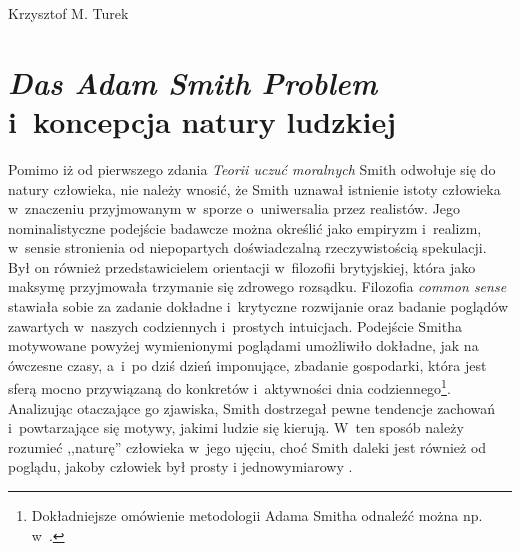 \begin{artplenv}{Krzysztof M. Turek}
\section{\textit{Das Adam Smith Problem} i~koncepcja natury ludzkiej}

Pomimo iż od pierwszego zdania \textit{Teorii uczuć moralnych} Smith
\parencite*[s.~5]{smith_teoria_1989}
odwołuje się do natury
człowieka, nie należy wnosić, że Smith uznawał istnienie istoty człowieka w~znaczeniu
przyjmowanym w~sporze o~uniwersalia przez realistów. Jego nominalistyczne podejście
badawcze można określić jako empiryzm i~realizm, w~sensie
stronienia od niepopartych doświadczalną rzeczywistością spekulacji. Był on również przedstawicielem
orientacji w~filozofii brytyjskiej, która jako maksymę przyjmowała trzymanie się zdrowego rozsądku.
Filozofia \textit{common sense} stawiała sobie za zadanie dokładne i~krytyczne
rozwijanie oraz badanie poglądów zawartych w~naszych
codziennych i~prostych intuicjach. Podejście Smitha motywowane powyżej
wymienionymi poglądami umożliwiło dokładne, jak na ówczesne
czasy, a~i~po dziś dzień imponujące, zbadanie gospodarki, która jest sferą mocno przywiązaną do konkretów i~aktywności
dnia codziennego\footnote{Dokładniejsze omówienie metodologii Adama Smitha odnaleźć
można np. w~\parencites[rozdz.~I–III]{fleischacker_adam_2005}[rozdz.~8 i~9]{myers_soul_1983}.
}. Analizując otaczające go
zjawiska, Smith dostrzegał pewne tendencje zachowań i~powtarzające się motywy, jakimi ludzie się kierują. W~ten sposób
należy rozumieć ,,naturę'' człowieka w~jego ujęciu, choć Smith daleki jest również od poglądu, jakoby człowiek był prosty
i jednowymiarowy
\parencite{lubinski_rola_2019}.


\end{artplenv}
